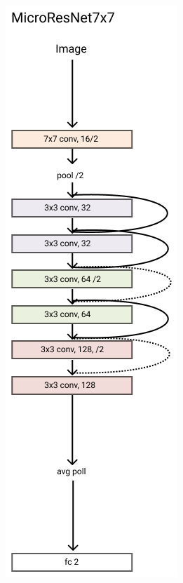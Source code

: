 \documentclass[../document.tex]{subfiles}
\begin{document}
\begin{figure}[htbp]
\begin{subfigure}[b]{0.22\textwidth}
        \caption{}
    \end{subfigure} 
    \begin{subfigure}[b]{0.22\textwidth}
        \includegraphics[width=\textwidth]{../img/3/models/transparent-microresnet7x7.png}

\end{subfigure}
\end{figure}
\end{document}

